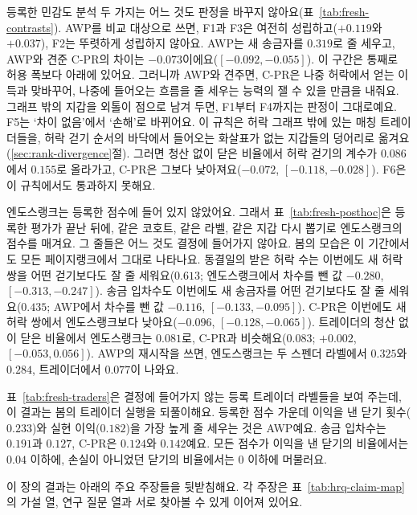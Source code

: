 등록한 민감도 분석 두 가지는 어느 것도 판정을 바꾸지 않아요(표~\ref{tab:fresh-contrasts}). AWP를 비교 대상으로 쓰면, F1과 F3은 여전히 성립하고($+0.119$와 $+0.037$), F2는 뚜렷하게 성립하지 않아요. AWP는 새 송금자를 $0.319$로 줄 세우고, AWP와 견준 C-PR의 차이는 $-0.073$이에요($[-0.092,-0.055]$). 이 구간은 통째로 허용 폭보다 아래에 있어요. 그러니까 AWP와 견주면, C-PR은 나중 허락에서 얻는 이득과 맞바꾸어, 나중에 들어오는 흐름을 줄 세우는 능력의 잴 수 있을 만큼을 내줘요. 그래프 밖의 지갑을 외톨이 점으로 남겨 두면, F1부터 F4까지는 판정이 그대로예요. F5는 ‘차이 없음’에서 ‘손해’로 바뀌어요. 이 규칙은 허락 그래프 밖에 있는 매칭 트레이더들을, 허락 걷기 순서의 바닥에서 들어오는 화살표가 없는 지갑들의 덩어리로 옮겨요(\ref{sec:rank-divergence}절). 그러면 청산 없이 닫은 비율에서 허락 걷기의 계수가 $0.086$에서 $0.155$로 올라가고, C-PR은 그보다 낮아져요($-0.072$, $[-0.118,-0.028]$). F6은 이 규칙에서도 통과하지 못해요.



엔도스랭크는 등록한 점수에 들어 있지 않았어요. 그래서 표~\ref{tab:fresh-posthoc}은 등록한 평가가 끝난 뒤에, 같은 코호트, 같은 라벨, 같은 지갑 다시 뽑기로 엔도스랭크의 점수를 매겨요. 그 줄들은 어느 것도 결정에 들어가지 않아요. 봄의 모습은 이 기간에서도 모든 페이지랭크에서 그대로 나타나요. 동결일의 받은 허락 수는 이번에도 새 허락 쌍을 어떤 걷기보다도 잘 줄 세워요($0.613$; 엔도스랭크에서 차수를 뺀 값 $-0.280$, $[-0.313,-0.247]$). 송금 입차수도 이번에도 새 송금자를 어떤 걷기보다도 잘 줄 세워요($0.435$; AWP에서 차수를 뺀 값 $-0.116$, $[-0.133,-0.095]$). C-PR은 이번에도 새 허락 쌍에서 엔도스랭크보다 낮아요($-0.096$, $[-0.128,-0.065]$). 트레이더의 청산 없이 닫은 비율에서 엔도스랭크는 $0.081$로, C-PR과 비슷해요($0.083$; $+0.002$, $[-0.053,0.056]$). AWP의 재시작을 쓰면, 엔도스랭크는 두 스펜더 라벨에서 $0.325$와 $0.284$, 트레이더에서 $0.077$이 나와요.



표~\ref{tab:fresh-traders}은 결정에 들어가지 않는 등록 트레이더 라벨들을 보여 주는데, 이 결과는 봄의 트레이더 실행을 되풀이해요. 등록한 점수 가운데 이익을 낸 닫기 횟수($0.233$)와 실현 이익($0.182$)을 가장 높게 줄 세우는 것은 AWP예요. 송금 입차수는 $0.191$과 $0.127$, C-PR은 $0.124$와 $0.142$예요. 모든 점수가 이익을 낸 닫기의 비율에서는 $0.04$ 이하에, 손실이 아니었던 닫기의 비율에서는 0 이하에 머물러요.


이 장의 결과는 아래의 주요 주장들을 뒷받침해요. 각 주장은 표~\ref{tab:hrq-claim-map}의 가설 열, 연구 질문 열과 서로 찾아볼 수 있게 이어져 있어요.

